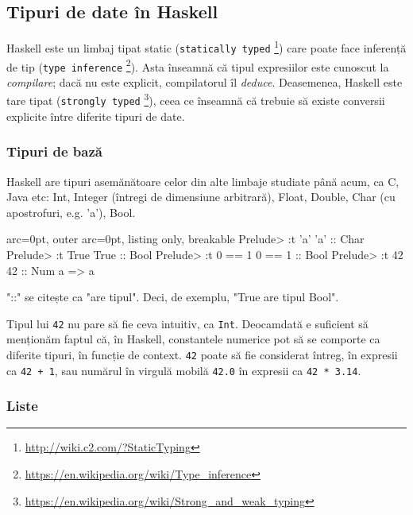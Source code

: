 \subsection*{ Tipuri de date în Haskell }

Haskell este un limbaj tipat static (\texttt{statically typed} \footnote{\url{http://wiki.c2.com/?StaticTyping}}) care poate face inferență de tip (\texttt{type inference} \footnote{\url{https://en.wikipedia.org/wiki/Type\_inference}}). Asta înseamnă că tipul expresiilor este cunoscut la \textit{compilare}; dacă nu este explicit, compilatorul îl \textit{deduce}. Deasemenea, Haskell este tare tipat (\texttt{strongly typed} \footnote{\url{https://en.wikipedia.org/wiki/Strong\_and\_weak\_typing}}), ceea ce înseamnă că trebuie să existe conversii explicite între diferite tipuri de date.

\subsubsection*{ Tipuri de bază }

Haskell are tipuri asemănătoare celor din alte limbaje studiate până acum, ca C, Java etc: Int, Integer (întregi de dimensiune arbitrară), Float, Double, Char (cu apostrofuri, e.g. 'a'), Bool.


\begin{tcblisting}{ arc=0pt, outer arc=0pt, listing only, breakable}
Prelude> :t 'a'
'a' :: Char
Prelude> :t True
True :: Bool
Prelude> :t 0 == 1
0 == 1 :: Bool
Prelude> :t 42
42 :: Num a => a

\end{tcblisting}


\begin{tcolorbox}[colback=blue!10, colframe=blue!20]
"::" se citește ca "are tipul". Deci, de exemplu, "True are tipul Bool".
\end{tcolorbox}

Tipul lui \texttt{42} nu pare să fie ceva intuitiv, ca \texttt{Int}. Deocamdată e suficient să menționăm faptul că, în Haskell, constantele numerice pot să se comporte ca diferite tipuri, în funcție de context. \texttt{42} poate să fie considerat întreg, în expresii ca \texttt{42 + 1}, sau numărul în virgulă mobilă \texttt{42.0} în expresii ca \texttt{42 * 3.14}.

\subsubsection*{ Liste }

